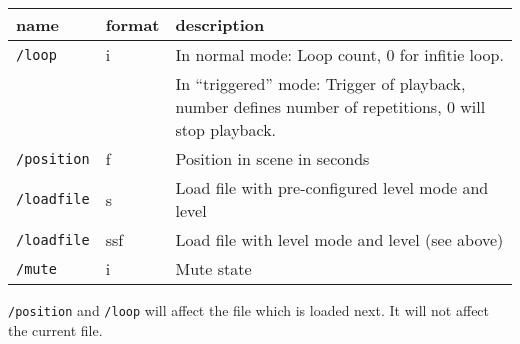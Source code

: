 \begin{tabularx}{\textwidth}{llX}
\hline
name            & format & description                                                                                             \\
\hline
{\tt /loop}     & i      & In normal mode: Loop count, 0 for infitie loop.                                                         \\
                &        & In ``triggered'' mode: Trigger of playback, number defines number of repetitions, 0 will stop playback. \\
{\tt /position} & f      & Position in scene in seconds                                                                            \\
{\tt /loadfile} & s      & Load file with pre-configured level mode and level                                                      \\
{\tt /loadfile} & ssf    & Load file with level mode and level (see above)                                                         \\
{\tt /mute}     & i      & Mute state                                                                                              \\
\hline
\end{tabularx}

\verb!/position! and \verb!/loop! will affect the file which is loaded next. It will not affect the current file.
